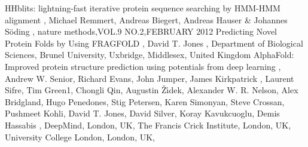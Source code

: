 \documentclass{article}
\begin{document}
\begin{thebibliography}{99}  
 HHblits: lightning-fast iterative protein sequence searching by HMM-HMM alignment
,
Michael Remmert, Andreas Biegert, Andreas Hauser \& Johannes Söding
,
nature methods,VOL.9 NO.2,FEBRUARY 2012
 Predicting Novel Protein Folds by Using FRAGFOLD
,
David T. Jones
,
Department of Biological Sciences, Brunel University, Uxbridge, Middlesex, United Kingdom
 AlphaFold: Improved protein structure prediction using potentials from deep learning
,
Andrew W. Senior, Richard Evans, John Jumper, James Kirkpatrick , Laurent Sifre, Tim Green1,
Chongli Qin, Augustin Žı́dek, Alexander W. R. Nelson, Alex Bridgland, Hugo Penedones,
Stig Petersen, Karen Simonyan, Steve Crossan, Pushmeet Kohli, David T. Jones, David Silver,
Koray Kavukcuoglu, Demis Hassabis
,
 DeepMind, London, UK,
The Francis Crick Institute, London, UK,
University College London, London, UK,
\end{thebibliography}
\end{document}
